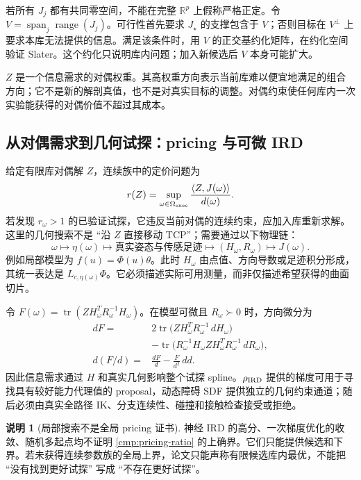 \documentclass[11pt,a4paper]{article}
\numberwithin{equation}{section}
\theoremstyle{definition}
\newtheorem{remark}[theorem]{说明}
\DeclareMathOperator{\tr}{tr}
\newcommand{\R}{\mathbb R}
\begin{document}
若所有 $J_j$ 都有共同零空间，不能在完整 $\R^p$ 上假称严格正定。令
$V=\operatorname{span}_j\operatorname{range}(J_j)$。可行性首先要求 $J_\star$ 的支撑包含于 $V$；否则目标在 $V^\perp$ 上要求本库无法提供的信息。满足该条件时，用 $V$ 的正交基约化矩阵，在约化空间验证 Slater。这个约化只说明库内问题；加入新候选后 $V$ 本身可能扩大。

$Z$ 是一个信息需求的对偶权重。其高权重方向表示当前库难以便宜地满足的组合方向；它不是新的解剖真值，也不是对真实目标的调整。对偶约束使任何库内一次实验能获得的对偶价值不超过其成本。

\subsection{从对偶需求到几何试探：pricing 与可微 IRD}
\label{cmp:pricing}

给定有限库对偶解 $Z$，连续族中的定价问题为
\begin{equation}
 r(Z)=\sup_{\omega\in\Omega_{\rm exec}}
       \frac{\langle Z,J(\omega)\rangle}{d(\omega)}.
 \label{cmp:pricing-ratio}
\end{equation}
若发现 $r_\omega>1$ 的已验证试探，它违反当前对偶的连续约束，应加入库重新求解。这里的几何搜索不是 ``沿 $Z$ 直接移动 TCP''；需要通过以下物理链：
\begin{equation}
 \omega\longmapsto\eta(\omega)
 \longmapsto\text{真实姿态与传感足迹}
 \longmapsto(H_\omega,R_\omega)
 \longmapsto J(\omega).
 \label{cmp:pricing-chain}
\end{equation}
例如局部模型为 $f(u)=\Phi(u)\theta$。此时 $H_\omega$ 由点值、方向导数或足迹积分形成，其统一表达是 $L_{c,\eta(\omega)}\Phi$。它必须描述实际可用测量，而非仅描述希望获得的曲面切片。

令 $F(\omega)=\tr(ZH_\omega^TR_\omega^{-1}H_\omega)$。在模型可微且 $R_\omega\succ0$ 时，方向微分为
\begin{align}
 dF={}&2\tr\bigl(ZH_\omega^TR_\omega^{-1}\,dH_\omega\bigr)\\
 &-\tr\bigl(R_\omega^{-1}H_\omega ZH_\omega^TR_\omega^{-1}\,dR_\omega\bigr),\\
 d(F/d)={}&\frac{dF}{d}-\frac{F}{d^2}\,dd.
 \label{cmp:pricing-gradient}
\end{align}
因此信息需求通过 $H$ 和真实几何影响整个试探 spline。$\rho_{\rm IRD}$ 提供的梯度可用于寻找具有较好能力代理值的 proposal，动态障碍 SDF 提供独立的几何约束通道；随后必须由真实全路径 IK、分支连续性、碰撞和接触检查接受或拒绝。

\begin{remark}[局部搜索不是全局 pricing 证书]
\label{cmp:pricing-warning}
神经 IRD 的高分、一次梯度优化的收敛、随机多起点均不证明 \eqref{cmp:pricing-ratio} 的上确界。它们只能提供候选和下界。若未获得连续参数族的全局上界，论文只能声称有限候选库内最优，不能把 ``没有找到更好试探'' 写成 ``不存在更好试探''。
\end{remark}
\end{document}
